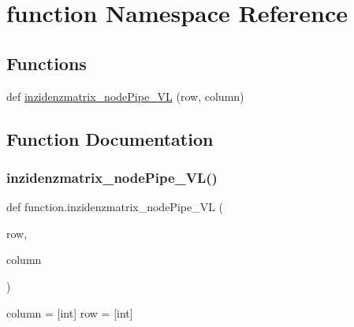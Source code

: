 \hypertarget{namespacefunction}{}\section{function Namespace Reference}
\label{namespacefunction}
\subsection*{Functions}
\begin{DoxyCompactItemize}
\item 
def \hyperlink{namespacefunction_a8dc2cfc1738c5c64a321bfaa3a5d93d6}{inzidenzmatrix\+\_\+node\+Pipe\+\_\+\+VL} (row, column)
\end{DoxyCompactItemize}


\subsection{Function Documentation}
\mbox{\label{namespacefunction_a8dc2cfc1738c5c64a321bfaa3a5d93d6}} 
\subsubsection{\texorpdfstring{inzidenzmatrix\+\_\+node\+Pipe\+\_\+\+V\+L()}{inzidenzmatrix\_nodePipe\_VL()}}
{\footnotesize\ttfamily def function.\+inzidenzmatrix\+\_\+node\+Pipe\+\_\+\+VL (\begin{DoxyParamCaption}\item[{}]{row,  }\item[{}]{column }\end{DoxyParamCaption})}

\begin{DoxyVerb}column = [int]
row = [int]
\end{DoxyVerb}
 